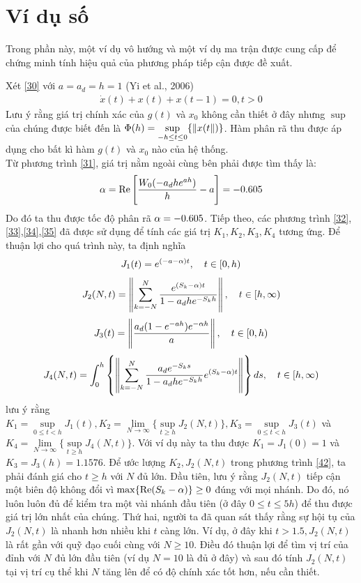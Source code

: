 \section{Ví dụ số}
Trong phần này, một ví dụ vô hướng và một ví dụ ma trận được cung cấp để chứng minh tính hiệu quả của phương pháp tiếp cận được đề xuất.
\begin{vd}
	Xét \eqref{30} với $a = a_d = h =1$ (Yi et al., 2006)
	\begin{align}\label{39}
		\dot{x}(t) +x(t) + x(t-1) = 0, t > 0
	\end{align}
	Lưu ý rằng giá trị chính xác của $g(t)$ và $x_0$ không cần thiết ở đây nhưng $\sup$ của chúng được biết đến là $\Phi(h) = \sup\limits_{-h \le t \le 0} \{\Vert x(t\Vert)\}$. Hàm phân rã thu được áp dụng cho bất kì hàm $g(t)$ và $x_0$ nào của hệ thống.\\
	Từ phương trình \eqref{31}, giá trị nằm ngoài cùng bên phải được tìm thấy là:
	\begin{align}\label{40}
		\alpha = \mathrm{Re} \left[\dfrac{W_0(-a_dhe^{ah})}{h} -a \right] = -0.605
	\end{align}
Do đó ta thu được tốc độ phân rã $\alpha= -0.605$. Tiếp theo, các phương trình \eqref{32}, \eqref{33},\eqref{34},\eqref{35} đã được sử dụng để tính các giá trị $K_1, K_2,K_3,K_4$ tương ứng. Để thuận lợi cho quá trình này, ta định nghĩa
\begin{align}\label{41}
	J_1(t) = e^{(-a-\alpha)t}, \quad t \in [0,h)
\end{align}
%
\begin{align}\label{42}
	J_2(N,t) = \left\Vert \sum_{k=-N}^N \dfrac{e^{(S_k - \alpha)t}}{1-a_dhe^{-S_kh}} \right\Vert, \quad t \in [h,\infty)
\end{align}
%
\begin{align}\label{43}
	J_3(t) = \left \Vert \dfrac{a_d(1-e^{-ah})e^{-\alpha h}}{a}\right \Vert, \quad t \in [0,h)
\end{align}
%
\begin{equation}\label{44}
	J_4(N,t) = \int_0^h \left\{\left\Vert \sum_{k=-N}^N \dfrac{a_de^{-S_ks }}{1-a_dhe^{-S_kh}}e^{(S_k-\alpha)t}\right\Vert \right\}ds , \quad t \in [h,\infty)
\end{equation}
lưu ý rằng $K_1 = \sup \limits_{0 \le t <h}J_1(t), K_2 = \lim\limits_{N\to\infty} \{\sup\limits_{t\ge h} J_2(N,t)\}, K_3 = \sup\limits_{0 \le t <h}J_3(t)$ và $K_4 = \lim\limits_{N\to \infty}\{\sup\limits_{t \ge h}J_4(N,t) \}$. Với ví dụ này ta thu được $K_1 = J_1(0)=1$ và $K_3= J_3(h) = 1.1576$. Để ước lượng $K_2, J_2(N,t)$ trong phương trình \eqref{42}, ta phải đánh giá cho $t \ge h$ với $N$ đủ lớn. Đầu tiên, lưu ý rằng $J_2(N,t)$ tiếp cận một biên độ không đổi vì $\max\{ \mathrm{Re}(S_k-\alpha) \} \ge 0$ đúng với mọi nhánh. Do đó, nó luôn luôn đủ để kiểm tra một vài nhánh đầu tiên (ở đây $0 \le t \le 5h$) để thu được giá trị lớn nhất của chúng. Thứ hai, người ta đã quan sát thấy rằng sự hội tụ của $J_2(N,t)$ là nhanh hơn nhiều khi $t$ càng lớn. Ví dụ, ở đây khi $t > 1.5, J_2(N,t)$ là rất gần với quỹ đạo cuối cùng với $ N \ge 10$. Điều đó thuận lợi để tìm vị trí của đỉnh với $N$ đủ lớn đầu tiên (ví dụ $N =10$ là đủ ở đây) và sau đó tính $J_2(N,t)$ tại vị trí cụ thể khi $N$ tăng lên để có độ chính xác tốt hơn, nếu cần thiết.\\

\end{vd}
